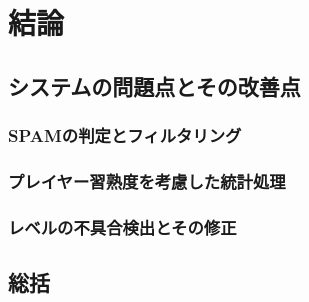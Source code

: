 \chapter{結論}

\section{システムの問題点とその改善点}
\subsection{SPAMの判定とフィルタリング}

\subsection{プレイヤー習熟度を考慮した統計処理}


\subsection{レベルの不具合検出とその修正}

\section{総括}
